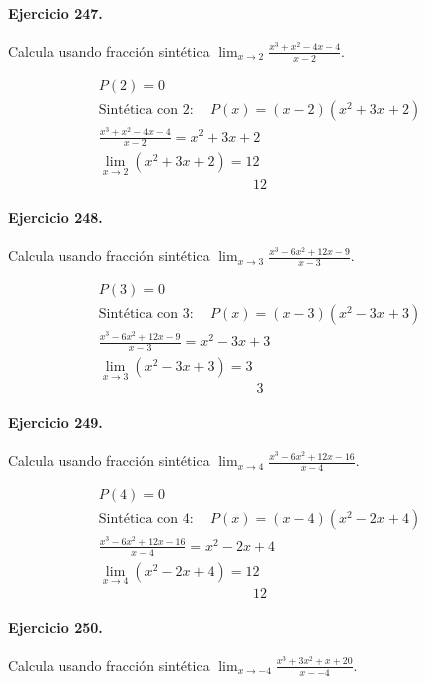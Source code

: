 \documentclass[11pt,a4paper]{article}
\begin{document}
\paragraph{Ejercicio 247.} Calcula usando fracción sintética $\displaystyle\lim_{x\to 2}\frac{x^3 + x^2 - 4x - 4}{x-2}$. 

\[
\begin{aligned}
P(2)=0\\
\text{Sintética con }2:\quad P(x)=(x-2)(x^2 + 3x + 2)\\
\frac{x^3 + x^2 - 4x - 4}{x-2}=x^2 + 3x + 2\\
\lim_{x\to 2}(x^2 + 3x + 2)=12
\end{aligned}
\]
\[\boxed{12}\]


\paragraph{Ejercicio 248.} Calcula usando fracción sintética $\displaystyle\lim_{x\to 3}\frac{x^3 - 6x^2 + 12x - 9}{x-3}$. 

\[
\begin{aligned}
P(3)=0\\
\text{Sintética con }3:\quad P(x)=(x-3)(x^2 - 3x + 3)\\
\frac{x^3 - 6x^2 + 12x - 9}{x-3}=x^2 - 3x + 3\\
\lim_{x\to 3}(x^2 - 3x + 3)=3
\end{aligned}
\]
\[\boxed{3}\]


\paragraph{Ejercicio 249.} Calcula usando fracción sintética $\displaystyle\lim_{x\to 4}\frac{x^3 - 6x^2 + 12x - 16}{x-4}$. 

\[
\begin{aligned}
P(4)=0\\
\text{Sintética con }4:\quad P(x)=(x-4)(x^2 - 2x + 4)\\
\frac{x^3 - 6x^2 + 12x - 16}{x-4}=x^2 - 2x + 4\\
\lim_{x\to 4}(x^2 - 2x + 4)=12
\end{aligned}
\]
\[\boxed{12}\]


\paragraph{Ejercicio 250.} Calcula usando fracción sintética $\displaystyle\lim_{x\to -4}\frac{x^3 + 3x^2 + x + 20}{x--4}$. 
\end{document}

